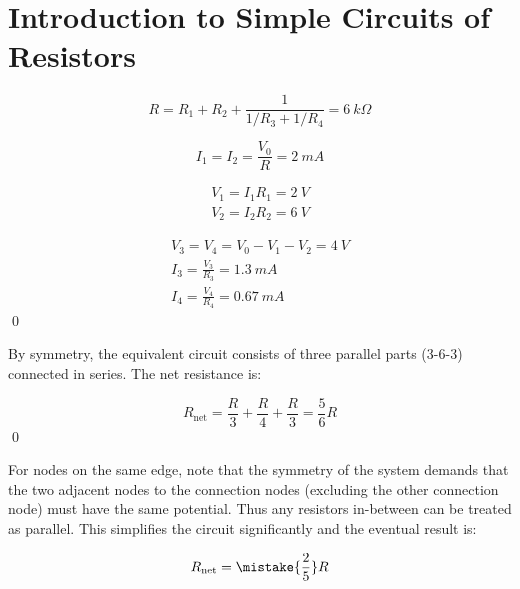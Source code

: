 \documentclass[12pt]{article}
\begin{document}



\pagebreak
\section*{Introduction to Simple Circuits of Resistors}



\begin{equation}
    R = R_{1} + R_{2} + \frac{1}{1/R_{3} + 1/R_{4}} = \qty{6}{k\Omega}
\end{equation}

\begin{equation}
    I_{1} = I_{2} = \frac{V_{0}}{R} = \qty{2}{mA}
\end{equation}

\begin{equation}
\begin{split}
    V_{1} = I_{1} R_{1} = \qty{2}{V} \\
    V_{2} = I_{2} R_{2} = \qty{6}{V}
\end{split}
\end{equation}

\begin{equation}
\begin{split}
    V_{3} = V_{4} = V_{0} - V_{1} - V_{2} = \qty{4}{V} \\
    I_{3} = \frac{V_{3}}{R_{3}} = \qty{1.3}{mA} \\
    I_{4} = \frac{V_{4}}{R_{4}} = \qty{0.67}{mA}
\end{split}
\end{equation}
\qed


By symmetry, the equivalent circuit consists of three parallel parts (3-6-3) connected in series. The net resistance is:

\begin{equation}
    R_{\text{net}} = \frac{R}{3} + \frac{R}{4} + \frac{R}{3} = \frac{5}{6} R
\end{equation}
\qed


For nodes on the same edge, note that the symmetry of the system demands that the two adjacent nodes to the connection nodes (excluding the other connection node) must have the same potential. Thus any resistors in-between can be treated as parallel. This simplifies the circuit significantly and the eventual result is:

\begin{equation}
    R_{\text{net}} = \mistake{\frac{2}{5}} R
\end{equation}
\end{document}
